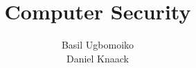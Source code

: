 \documentclass[sheet=2, prefix]{dexercise}
\title{Computer Security}
\author{Basil Ugbomoiko\\Daniel Knaack}
\begin{document}
\task
\end{document}
